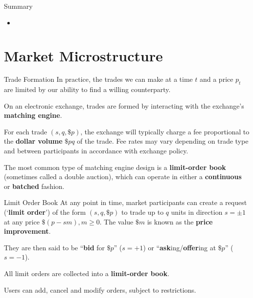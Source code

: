 \documentclass{beamer}
\begin{document}
\begin{frame}{Summary}
	\begin{itemize}
		\item 
	\end{itemize}
\end{frame}

\section{Market Microstructure}
\begin{frame}{Trade Formation}
	In practice, the trades we can make at a time $t$ and a price $p_t$ are limited by our ability to find a willing counterparty.

	\pause
	On an electronic exchange, trades are formed by interacting with the exchange's \textbf{matching engine}.%

	For each trade $(s,q,\$p)$, the exchange will typically charge a fee proportional to the \textbf{dollar volume} $\$pq$ of the trade. Fee rates may vary depending on trade type and between participants in accordance with exchange policy.

	\pause

	The most common type of matching engine design is a \textbf{limit-order book} (sometimes called a double auction), which can operate in either a \textbf{continuous} or \textbf{batched} fashion.
\end{frame}

\begin{frame}{Limit Order Book}%
	At any point in time, market participants can create a request (`\textbf{limit order}') of the form $(s,q,\$p)$ to trade up to $q$ units in direction $s=\pm1$ at any price $\$(p-sm), m\geq0$. The value $\$m$ is known as the \textbf{price improvement}. %
	
	They are then said to be ``\textbf{bid} for $\$p$'' ($s=+1$) or ``\textbf{ask}ing/\textbf{offer}ing at $\$p$'' ($s=-1$). %

	\pause

	All limit orders are collected into a \textbf{limit-order book}.

	Users can add, cancel and modify orders, subject to restrictions.%
\end{frame}
\end{document}
